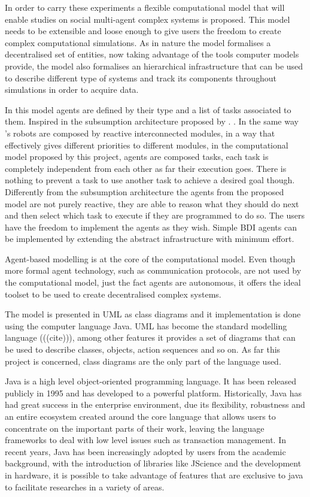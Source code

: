 In order to carry these experiments a flexible computational model that will enable studies on social multi-agent complex systems is proposed. This model needs to be extensible and loose enough to give users the freedom to create complex computational simulations. As in nature the model formalises a decentralised set of entities, now taking advantage of the tools computer models provide, the model also formalises an hierarchical infrastructure that can be used to describe different type of systems and track its components throughout simulations in order to acquire data.
 
In this model agents are defined by their type and a list of tasks associated to them. Inspired in the subsumption architecture proposed by \citeauthor{1087032}. \cite{1087032} \cite{Brooks1986b}. In the same way \citeauthor{1087032}'s robots are composed by reactive interconnected modules, in a way that effectively gives different priorities to different modules, in the computational model proposed by this project, agents are composed tasks, each task is completely independent from each other as far their execution goes. There is nothing to prevent a task to use another task to achieve a desired goal though. Differently from the subsumption architecture the agents from the proposed model are not purely reactive, they are able to reason what they should do next and then select which task to execute if they are programmed to do so. The users have the freedom to implement the agents as they wish. Simple BDI \cite{bratman1999intention} \cite{wooldridge2009introduction} agents can be implemented by extending the abstract infrastructure with minimum effort.

Agent-based modelling is at the core of the computational model. Even though more formal agent technology, such as communication protocols, are not used by the computational model, just the fact agents are autonomous, it offers the ideal toolset to be used to create decentralised complex systems.

The model is presented in UML as class diagrams and it implementation is done using the computer language Java. UML has become the standard modelling language (((cite))), among other features it provides a set of diagrams that can be used to describe classes, objects, action sequences and so on. As far this project is concerned, class diagrams are the only part of the language used.

Java is a high level object-oriented programming language. It has been released publicly in 1995 and has developed to a powerful platform. Historically, Java has had great success in the enterprise environment, due its flexibility, robustness and an entire ecosystem created around the core language that allows users to concentrate on the important parts of their work, leaving the language frameworks to deal with low level issues such as transaction management. In recent years, Java has been increasingly adopted by users from the academic background, with the introduction of libraries like JScience and the development in hardware, it is possible to take advantage of features that are exclusive to java to facilitate researches in a variety of areas.

